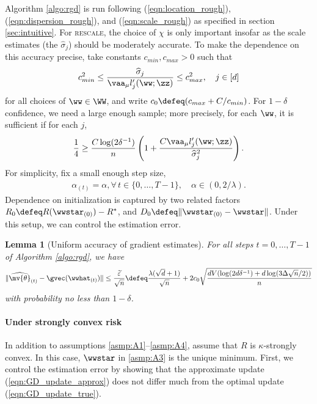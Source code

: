 \documentclass[11pt,oneside]{article}
\theoremstyle{definition} \newtheorem{defn}{Definition}       %
\theoremstyle{plain} \newtheorem{prop}[defn]{Proposition}           %
\theoremstyle{plain} \newtheorem{thm}[defn]{Theorem}                %
\theoremstyle{plain} \newtheorem{lem}[defn]{Lemma}                  %
\theoremstyle{plain} \newtheorem{cor}[defn]{Corollary}              %
\theoremstyle{remark} \newtheorem{rmk}[defn]{Remark}                %
\theoremstyle{remark} \newtheorem{ex}[defn]{Example}                %
\begin{document}
Algorithm \ref{algo:rgd} is run following (\ref{eqn:location_rough}), (\ref{eqn:dispersion_rough}), and (\ref{eqn:scale_rough}) as specified in section \ref{sec:intuitive}. For \textsc{rescale}, the choice of $\chi$ is only important insofar as the scale estimates (the $\widehat{\sigma}_{j}$) should be moderately accurate. To make the dependence on this accuracy precise, take constants $c_{min},c_{max} > 0$ such that
%
\begin{align}\label{eqn:req_dispersion}
c_{min}^{2} \leq \frac{\widehat{\sigma}_{j}}{\vaa_{\mu}l_{j}^{\prime}(\ww;\zz)} \leq c_{max}^{2}, \quad j \in [d]
\end{align}
%
for all choices of $\ww \in \WW$, and write $c_{0} \defeq (c_{max}+C/c_{min})$. For $1-\delta$ confidence, we need a large enough sample; more precisely, for each $\ww$, it is sufficient if for each $j$,
%
\begin{align}\label{eqn:req_n_general}
\frac{1}{4} \geq \frac{C\log(2\delta^{-1})}{n}\left(1 + \frac{C\vaa_{\mu}l_{j}^{\prime}(\ww;\zz)}{\widehat{\sigma}_{j}^{2}}\right).
\end{align}
%
For simplicity, fix a small enough step size, 
%
\begin{align}\label{eqn:req_GD_update}
\alpha_{(t)} = \alpha, \forall \, t \in \{0,\ldots,T-1\}, \quad \alpha \in (0,2/\lambda).
\end{align}
%
Dependence on initialization is captured by two related factors $R_{0} \defeq R(\wwstar_{(0)})-R^{\ast}$, and $D_{0} \defeq \|\wwstar_{(0)}-\wwstar\|$. Under this setup, we can control the estimation error.
%
\begin{lem}[Uniform accuracy of gradient estimates]\label{lem:grad_estimate}
For all steps $t=0,\ldots,T-1$ of Algorithm \ref{algo:rgd}, we have
%
\begin{align*}
\|\widehat{\mv{\theta}}_{(t)}-\gvec(\wwhat_{(t)})\| \leq \frac{\widetilde{\varepsilon}}{\sqrt{n}} \defeq \frac{\lambda(\sqrt{d}+1)}{\sqrt{n}} + 2c_{0} \sqrt{\frac{dV(\log(2d\delta^{-1}) + d\log(3\Delta\sqrt{n}/2))}{n}}
\end{align*}
%
with probability no less than $1-\delta$.
\end{lem}


\paragraph{Under strongly convex risk}

In addition to assumptions \ref{asmp:A1}--\ref{asmp:A4}, assume that $R$ is $\kappa$-strongly convex. In this case, $\wwstar$ in \ref{asmp:A3} is the unique minimum. First, we control the estimation error by showing that the approximate update (\ref{eqn:GD_update_approx}) does not differ much from the optimal update (\ref{eqn:GD_update_true}).
\end{document}
